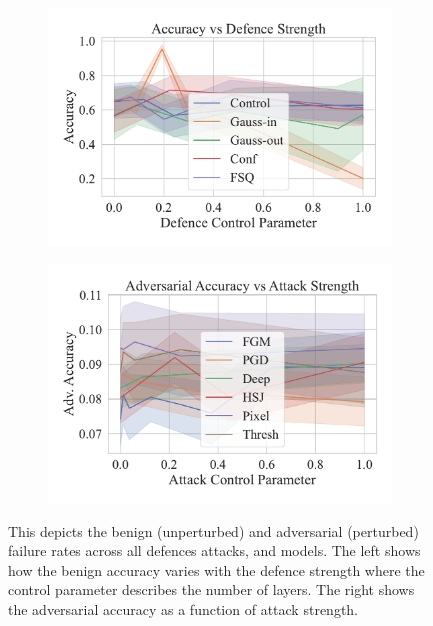 \begin{figure}[h!]
    \centering
    \begin{subfigure}[]{0.45\textwidth}
        \centering
        \includegraphics[width=\textwidth]{mnist/def_param_vs_accuracy.pdf}
    \end{subfigure}
    \begin{subfigure}[]{0.45\textwidth}
        \centering
        \includegraphics[width=\textwidth]{mnist/atk_param_vs_accuracy.pdf}
    \end{subfigure}
    \caption{This depicts the benign (unperturbed) and adversarial (perturbed) failure rates across all defences attacks, and models. The left shows how the benign accuracy varies with the defence strength where the control parameter describes the number of layers. The right shows the adversarial accuracy as a function of attack strength.}
    \label{fig:mnist_strength}
\end{figure}

